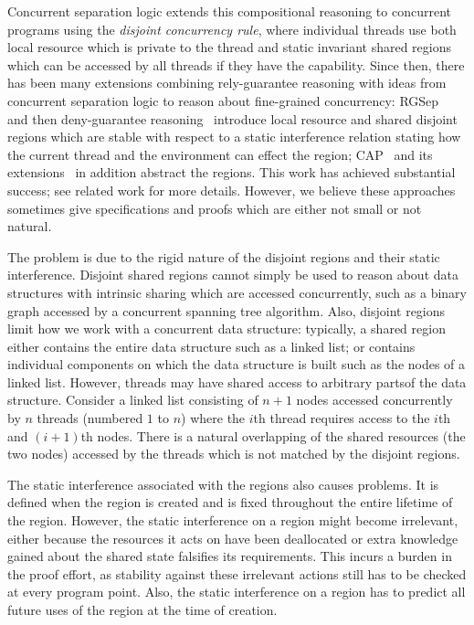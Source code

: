 Concurrent separation logic extends this compositional reasoning  to concurrent programs
using the {\em disjoint concurrency rule}, where individual threads
use both local resource which is private to the thread and static
invariant shared regions which can be accessed by all threads if they
have the capability. Since
then, there has been many extensions combining rely-guarantee
reasoning with ideas from concurrent separation logic to reason about
fine-grained concurrency: RGSep~\cite{viktor-marriage} and then
deny-guarantee reasoning~\cite{dg} introduce local resource and shared
disjoint regions which are stable with respect to a static  interference
relation stating how the current thread and the environment can effect
the region; CAP~\cite{cap-ecoop10} and its
extensions~\cite{hocap,icap,tada} in addition abstract the
regions. This work has achieved substantial success; see related work
for more details. However,  we believe these approaches sometimes   give
specifications and proofs which are either not small or not natural.



The problem is due to the rigid nature of the disjoint regions and
their static interference. Disjoint shared regions cannot simply be
used to reason about  data structures with intrinsic sharing which are
accessed concurrently, such as a binary graph accessed by a concurrent
spanning tree algorithm. Also, disjoint regions  limit how we  work
with a
concurrent data structure: typically, a shared region either contains
the entire data structure such as a linked list; or contains
individual 
components on which the data structure is built such as the nodes of a
linked list. However, threads may have shared access to arbitrary
partsof the data structure.
Consider a linked list consisting of $n+1$ nodes accessed
concurrently by $n$ threads (numbered $1$ to $n$) where the $i$th
thread requires access to the $i$th and $(i+1)$th nodes.  There is a
natural 
overlapping of the shared resources (the two nodes) accessed by the threads which
 is not matched by  the disjoint regions. 



The static interference associated with the regions also causes
problems. It  is defined when
the region  is created and is fixed throughout the entire lifetime of
the region. However, the static interference  on a region might 
become irrelevant, either because the resources it acts on have been
deallocated or extra knowledge gained about the shared state
falsifies its requirements.  This incurs
a burden in the proof effort, as stability against these irrelevant
actions still has to be checked at every program point.
Also, the static interference on  a region has to predict all future 
uses of the region at the time of creation. 





